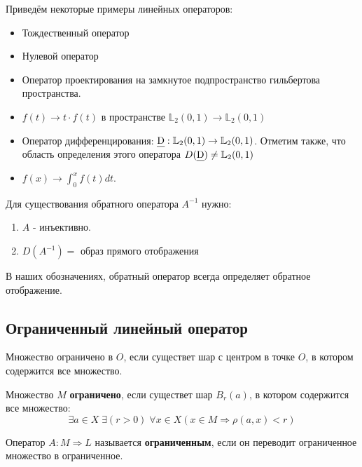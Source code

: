 	Приведём некоторые примеры линейных операторов:
	\begin{itemize}
		\item Тождественный оператор
		\item Нулевой оператор
		\item Оператор проектирования на замкнутое подпространство гильбертова пространства.
		\item $f(t) \rightarrow t \cdot f(t)$ в пространстве $\mathbb{L}_2 (0,1) \rightarrow \mathbb{L}_2 (0,1)$
		\item Оператор дифференцирования: $\text{\emph{D}}: \mathbb{L}_2 (0,1) \rightarrow \mathbb{L}_2 (0,1)$. Отметим также, что
		область определения этого оператора $D(\text{\emph{D}}) \neq \mathbb{L}_2 (0,1)$
		\item $f(x) \rightarrow \int_0^x f(t) dt$.
	\end{itemize}
	
	Для существования обратного оператора $A^{-1}$ нужно:
	\begin{enumerate}
		\item $A$ - инъективно.
		\item $D(A^{-1}) = $ образ прямого отображения
	\end{enumerate}
	В наших обозначениях, обратный оператор всегда определяет обратное отображение.

	\subsection{Ограниченный линейный оператор}	
	
	\begin{defi}
		Множество ограничено в $O$, если существет шар с центром в точке $O$, в котором содержится все множество.
	\end{defi}
	\begin{defi}
		Множество $M$ \textbf{ограничено}, если существет шар $B_r(a)$, в котором содержится все множество:
		$$ \exists a \in X \; \exists (r > 0) \; \forall x \in X (x \in M \Rightarrow \rho(a, x) < r) $$
	\end{defi}
	\begin{defi}
		Оператор $A: M \Rightarrow L$ называется \textbf{ограниченным}, если он переводит ограниченное множество
		в ограниченное.
	\end{defi}
	
